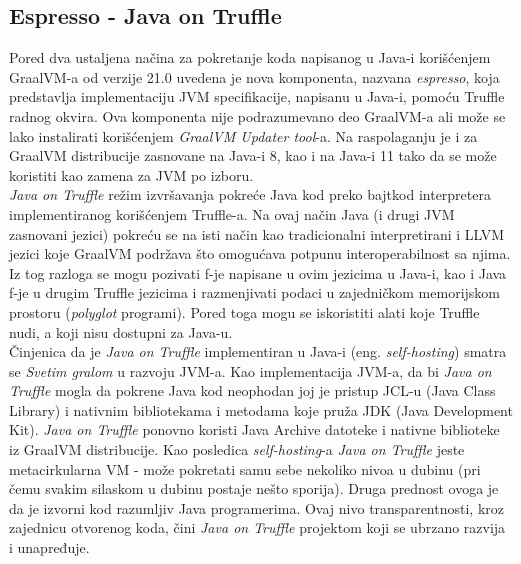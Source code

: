\documentclass[a4paper]{article}
\begin{document}
\subsection{Espresso - Java on Truffle}
\label{sub:Espresso - Java on Truffle}

Pored dva ustaljena načina za pokretanje koda napisanog u Java-i korišćenjem GraalVM-a od verzije 21.0 uvedena je nova komponenta, nazvana \emph{espresso}, koja predstavlja implementaciju JVM specifikacije, napisanu u Java-i, pomoću Truffle radnog okvira. Ova komponenta nije podrazumevano deo GraalVM-a ali može se lako instalirati korišćenjem \emph{GraalVM Updater tool}-a. Na raspolaganju je i za GraalVM distribucije zasnovane na Java-i 8, kao i na Java-i 11 tako da se može koristiti kao zamena za JVM po izboru. \\


\emph{Java on Truffle} režim izvršavanja pokreće Java kod preko bajtkod interpretera implementiranog korišćenjem Truffle-a. Na ovaj način Java (i drugi JVM zasnovani jezici) pokreću se na isti način kao tradicionalni interpretirani i LLVM jezici koje GraalVM podržava što omogućava potpunu interoperabilnost sa njima. Iz tog razloga se mogu pozivati f-je napisane u ovim jezicima u Java-i, kao i Java f-je u drugim Truffle jezicima i razmenjivati podaci u zajedničkom memorijskom prostoru (\emph{polyglot} programi). Pored toga mogu se iskoristiti alati koje Truffle nudi, a koji nisu dostupni za Java-u. \\

Činjenica da je \emph{Java on Truffle} implementiran u Java-i (eng. \emph{self-hosting}) smatra se \emph{Svetim gralom} u razvoju JVM-a. Kao implementacija JVM-a, da bi \emph{Java on Truffle} mogla da pokrene Java kod neophodan joj je pristup JCL-u (Java Class Library) i nativnim bibliotekama i metodama koje pruža JDK (Java Development Kit). \emph{Java on Truffle} ponovno koristi Java Archive datoteke i nativne biblioteke iz GraalVM distribucije. Kao posledica \emph{self-hosting}-a \emph{Java on Truffle} jeste metacirkularna VM - može pokretati samu sebe nekoliko nivoa u dubinu (pri čemu svakim silaskom u dubinu postaje nešto sporija). Druga prednost ovoga je da je izvorni kod razumljiv Java programerima. Ovaj nivo transparentnosti, kroz zajednicu otvorenog koda, čini \emph{Java on Truffle} projektom koji se ubrzano razvija i unapređuje. \\
\end{document}
